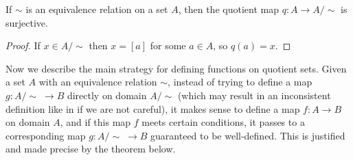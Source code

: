 \begin{lemma}
	If $\sim$ is an equivalence relation on a set $A$, then the quotient map $q:A\rightarrow A/\sim$ is surjective.
\end{lemma}
\begin{proof}
	If $x\in A/\sim$ then $x = [a]$ for some $a\in A$, so $q(a) = x$. 
\end{proof}

Now we describe the main strategy for defining functions on quotient sets. 
Given a set $A$ with an equivalence relation $\sim$, instead of trying to define a map $g:A/\sim\;\rightarrow B$ directly on domain $A/\sim$ (which may result in an inconsistent definition like in  if we are not careful), it makes sense to define a map $f:A\rightarrow B$ on domain $A$, and if this map $f$ meets certain conditions, it passes to a corresponding map $g:A/\sim\;\rightarrow B$ guaranteed to be well-defined. 
This is justified and made precise by the theorem below. 

